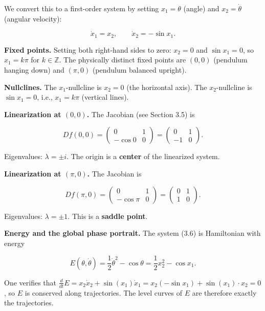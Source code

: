 We convert this to a first-order system by setting $x_1 = \theta$ (angle) and $x_2 = \dot{\theta}$ (angular velocity):

\begin{equation}\label{eq:3.6}\tag{3.6}
\dot{x}_1 = x_2, \qquad \dot{x}_2 = -\sin x_1.
\end{equation}

\textbf{Fixed points.} Setting both right-hand sides to zero: $x_2 = 0$ and $\sin x_1 = 0$, so $x_1 = k\pi$ for $k \in \mathbb{Z}$. The physically distinct fixed points are $(0, 0)$ (pendulum hanging down) and $(\pi, 0)$ (pendulum balanced upright).

\textbf{Nullclines.} The $x_1$-nullcline is $x_2 = 0$ (the horizontal axis). The $x_2$-nullcline is $\sin x_1 = 0$, i.e., $x_1 = k\pi$ (vertical lines).

\textbf{Linearization at $(0, 0)$.} The Jacobian (see Section 3.5) is

\[
Df(0,0) = \begin{pmatrix} 0 & 1 \\ -\cos 0 & 0 \end{pmatrix} = \begin{pmatrix} 0 & 1 \\ -1 & 0 \end{pmatrix}.
\]

Eigenvalues: $\lambda = \pm i$. The origin is a \textbf{center} of the linearized system.

\textbf{Linearization at $(\pi, 0)$.} The Jacobian is

\[
Df(\pi, 0) = \begin{pmatrix} 0 & 1 \\ -\cos\pi & 0 \end{pmatrix} = \begin{pmatrix} 0 & 1 \\ 1 & 0 \end{pmatrix}.
\]

Eigenvalues: $\lambda = \pm 1$. This is a \textbf{saddle point}.

\textbf{Energy and the global phase portrait.} The system (3.6) is Hamiltonian with energy

\[
E(\theta, \dot\theta) = \frac{1}{2}\dot\theta^2 - \cos\theta = \frac{1}{2}x_2^2 - \cos x_1.
\]

One verifies that $\frac{d}{dt}E = x_2 \dot{x}_2 + \sin(x_1)\dot{x}_1 = x_2(-\sin x_1) + \sin(x_1)\cdot x_2 = 0$, so $E$ is conserved along trajectories. The level curves of $E$ are therefore exactly the trajectories.

